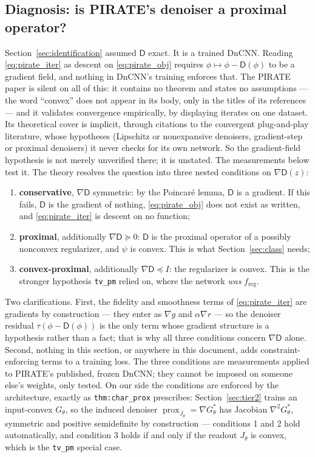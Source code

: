 \documentclass[11pt]{article}
\theoremstyle{definition}
\newcommand{\D}{\mathsf{D}}
\newcommand{\freg}{f_{\mathrm{reg}}}
\newcommand{\prox}{\operatorname{prox}}
\newcommand{\code}[1]{\texttt{#1}}
\begin{document}
\subsection{Diagnosis: is PIRATE's denoiser a proximal operator?}
\label{sec:tier1}

Section~\ref{sec:identification} assumed $\D$ exact. It is a trained DnCNN. Reading \eqref{eq:pirate_iter} as descent on \eqref{eq:pirate_obj} requires $\phi\mapsto\phi-\D(\phi)$ to be a gradient field, and nothing in DnCNN's training enforces that. The PIRATE paper is silent on all of this: it contains no theorem and states no assumptions — the word ``convex'' does not appear in its body, only in the titles of its references — and it validates convergence empirically, by displaying iterates on one dataset. Its theoretical cover is implicit, through citations to the convergent plug-and-play literature, whose hypotheses (Lipschitz or nonexpansive denoisers, gradient-step or proximal denoisers) it never checks for its own network. So the gradient-field hypothesis is not merely unverified there; it is unstated. The measurements below test it. The theory resolves the question into three nested conditions on $\nabla\D(z)$:

\begin{enumerate}[leftmargin=2em]
\item \textbf{conservative}, $\nabla\D$ symmetric: by the Poincar\'e lemma, $\D$ is a gradient. If this fails, $\D$ is the gradient of nothing, \eqref{eq:pirate_obj} does not exist as written, and \eqref{eq:pirate_iter} is descent on no function;
\item \textbf{proximal}, additionally $\nabla\D\succeq0$: $\D$ is the proximal operator of a possibly nonconvex regularizer, and $\psi$ is convex. This is what Section~\ref{sec:class} needs;
\item \textbf{convex-proximal}, additionally $\nabla\D\preceq I$: the regularizer is convex. This is the stronger hypothesis \code{tv\_pm} relied on, where the network \emph{was} $\freg$.
\end{enumerate}

Two clarifications. First, the fidelity and smoothness terms of \eqref{eq:pirate_iter} are gradients by construction — they enter as $\nabla g$ and $\alpha\nabla r$ — so the denoiser residual $\tau(\phi - \D(\phi))$ is the only term whose gradient structure is a hypothesis rather than a fact; that is why all three conditions concern $\nabla\D$ alone. Second, nothing in this section, or anywhere in this document, adds constraint-enforcing terms to a training loss. The three conditions are measurements applied to PIRATE's published, frozen DnCNN; they cannot be imposed on someone else's weights, only tested. On our side the conditions are enforced by the architecture, exactly as \code{thm:char\_prox} prescribes: Section~\ref{sec:tier2} trains an input-convex $G_\theta$, so the induced denoiser $\prox_{J_\theta} = \nabla G_\theta^*$ has Jacobian $\nabla^2 G_\theta^*$, symmetric and positive semidefinite by construction — conditions 1 and 2 hold automatically, and condition 3 holds if and only if the readout $J_\theta$ is convex, which is the \code{tv\_pm} special case.
\end{document}
